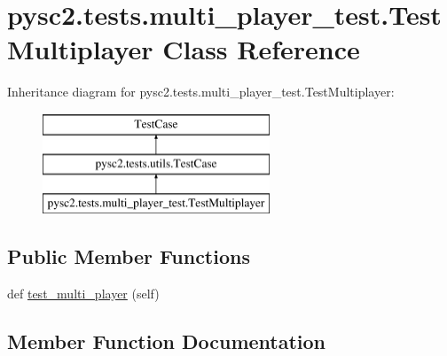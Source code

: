 \hypertarget{classpysc2_1_1tests_1_1multi__player__test_1_1_test_multiplayer}{}\section{pysc2.\+tests.\+multi\+\_\+player\+\_\+test.\+Test\+Multiplayer Class Reference}
\label{classpysc2_1_1tests_1_1multi__player__test_1_1_test_multiplayer}
Inheritance diagram for pysc2.\+tests.\+multi\+\_\+player\+\_\+test.\+Test\+Multiplayer\+:\begin{figure}[H]
\begin{center}
\leavevmode
\includegraphics[height=3.000000cm]{classpysc2_1_1tests_1_1multi__player__test_1_1_test_multiplayer}
\end{center}
\end{figure}
\subsection*{Public Member Functions}
\begin{DoxyCompactItemize}
\item 
def \mbox{\hyperlink{classpysc2_1_1tests_1_1multi__player__test_1_1_test_multiplayer_a78c8b864db364712d08f9fb051a0c80c}{test\+\_\+multi\+\_\+player}} (self)
\end{DoxyCompactItemize}


\subsection{Member Function Documentation}
\mbox{\label{classpysc2_1_1tests_1_1multi__player__test_1_1_test_multiplayer_a78c8b864db364712d08f9fb051a0c80c}} 
